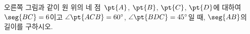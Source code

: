 \noindent\begin{minipage}[t]{0.58\linewidth}\vspace{0pt}\raggedright 오른쪽 그림과 같이 원 위의 네 점~$\pt{A}$, $\pt{B}$, $\pt{C}$, $\pt{D}$에 대하여 $\seg{BC}=6$이고 $\angle\pt{ACB}=60^\circ$, $\angle\pt{BDC}=45^\circ$일 때, $\seg{AB}$의 길이를 구하시오.\end{minipage}\hfill\begin{minipage}[t]{0.4\linewidth}\vspace{0pt}\centering \resizebox{\ifdim\width>\linewidth\linewidth\else\width\fi}{!}{}\end{minipage}\par
